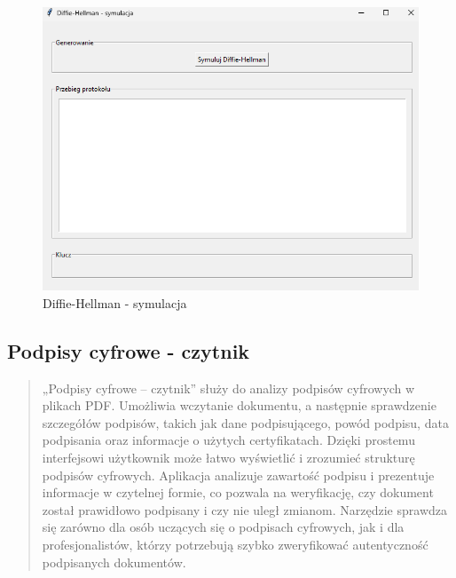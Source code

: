 \documentclass[12pt,a4paper]{article}
\begin{document}
\begin{figure}[!htb]
\begin{center}
\includegraphics[scale=0.45]{pictures/dfsymulacja.png}
\caption{Diffie-Hellman - symulacja}
\label{fig:Diffie-Hellman - symulacja}
\end{center}
\end{figure}

\subsection{Podpisy cyfrowe - czytnik}
\begin{quotation} \noindent „Podpisy cyfrowe – czytnik” służy do analizy podpisów cyfrowych w plikach PDF. Umożliwia wczytanie dokumentu, a następnie sprawdzenie szczegółów podpisów, takich jak dane podpisującego, powód podpisu, data podpisania oraz informacje o użytych certyfikatach. Dzięki prostemu interfejsowi użytkownik może łatwo wyświetlić i zrozumieć strukturę podpisów cyfrowych. Aplikacja analizuje zawartość podpisu i prezentuje informacje w czytelnej formie, co pozwala na weryfikację, czy dokument został prawidłowo podpisany i czy nie uległ zmianom. Narzędzie sprawdza się zarówno dla osób uczących się o podpisach cyfrowych, jak i dla profesjonalistów, którzy potrzebują szybko zweryfikować autentyczność podpisanych dokumentów.\newline
\end{quotation}
\end{document}
